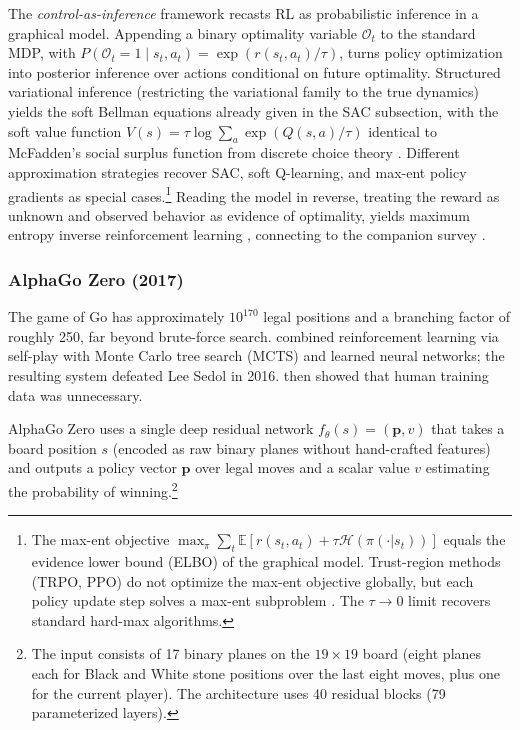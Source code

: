 The \emph{control-as-inference} framework \citep{Todorov2006, Levine2018} recasts RL as probabilistic inference in a graphical model. Appending a binary optimality variable $\mathcal{O}_t$ to the standard MDP, with $P(\mathcal{O}_t = 1 \mid s_t, a_t) = \exp(r(s_t,a_t)/\tau)$, turns policy optimization into posterior inference over actions conditional on future optimality. Structured variational inference (restricting the variational family to the true dynamics) yields the soft Bellman equations already given in the SAC subsection, with the soft value function $V(s) = \tau \log \sum_a \exp(Q(s,a)/\tau)$ identical to McFadden's social surplus function from discrete choice theory \citep{McFadden1978}. Different approximation strategies recover SAC, soft Q-learning, and max-ent policy gradients as special cases.\footnote{The max-ent objective $\max_\pi \sum_t \mathbb{E}[r(s_t,a_t) + \tau \mathcal{H}(\pi(\cdot|s_t))]$ equals the evidence lower bound (ELBO) of the graphical model. Trust-region methods (TRPO, PPO) do not optimize the max-ent objective globally, but each policy update step solves a max-ent subproblem \citep{Schulman2015, Schulman2017}. The $\tau \to 0$ limit recovers standard hard-max algorithms.} Reading the model in reverse, treating the reward as unknown and observed behavior as evidence of optimality, yields maximum entropy inverse reinforcement learning \citep{Ziebart2008}, connecting to the companion survey \citep{RustRawat2026}.

\subsubsection{AlphaGo Zero (2017)}
\label{subsubsec:alphago_zero}

The game of Go has approximately $10^{170}$ legal positions and a branching factor of roughly 250, far beyond brute-force search. \citet{Silver2016} combined reinforcement learning via self-play with Monte Carlo tree search (MCTS) and learned neural networks; the resulting system defeated Lee Sedol in 2016. \citet{Silver2017} then showed that human training data was unnecessary.

AlphaGo Zero uses a single deep residual network $f_\theta(s) = (\mathbf{p}, v)$ that takes a board position $s$ (encoded as raw binary planes without hand-crafted features) and outputs a policy vector $\mathbf{p}$ over legal moves and a scalar value $v$ estimating the probability of winning.\footnote{The input consists of 17 binary planes on the $19 \times 19$ board (eight planes each for Black and White stone positions over the last eight moves, plus one for the current player). The architecture uses 40 residual blocks (79 parameterized layers).}

